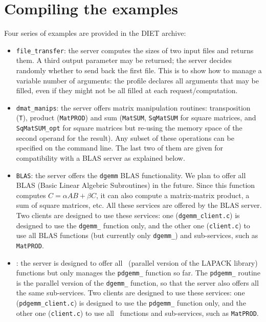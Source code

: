 \section{Compiling the examples}

Four series of examples are provided in the DIET archive:
\begin{itemize}
\item{\texttt{file\_transfer}}: the server computes the sizes of two
  input files and returns them. A third output parameter may be
  returned; the server decides randomly whether to send back the
  first file. This is to show how to manage a variable number of
  arguments: the profile declares all arguments that may be filled,
  even if they might not be all filled at each request/computation.

\item{\texttt{dmat\_manips}}: the server offers matrix manipulation
  routines: transposition (\texttt{T}), product (\texttt{MatPROD}) and
  sum (\texttt{MatSUM}, \texttt{SqMatSUM} for square matrices, and
  \texttt{SqMatSUM\_opt} for square matrices but re-using the memory
  space of the second operand for the result). Any subset of these
  operations can be specified on the command line. The last two of
  them are given for compatibility with a BLAS server as explained below.
  
\item{\texttt{BLAS}}: the server offers the \texttt{dgemm} BLAS
  functionality.  We plan to offer all BLAS (Basic Linear Algebric
  Subroutines) in the future. Since this function computes
  $C = \alpha AB + \beta C$, it can also compute a matrix-matrix
  product, a sum of square matrices, etc. All these services are
  offered by the BLAS server. Two clients are designed to use these
  services: one (\texttt{dgemm\_client.c}) is designed to use the
  \texttt{dgemm\_} function only, and the other one
  (\texttt{client.c}) to use all BLAS functions (but currently only
  \texttt{dgemm\_}) and sub-services, such as \texttt{MatPROD}.
  
\item{\texttt{\scalapack}}: the server is designed to offer all
  \scalapack\  (parallel version of the LAPACK library) functions but
  only manages the \texttt{pdgemm\_} function so far. The
  \texttt{pdgemm\_} routine is the parallel version of the
  \texttt{dgemm\_} function, so that the server also offers all the
  same sub-services. Two clients are designed to use these services:
  one (\texttt{pdgemm\_client.c}) is designed to use the
  \texttt{pdgemm\_} function only, and the other one
  (\texttt{client.c}) to use all \scalapack\ functions and
  sub-services, such as \texttt{MatPROD}.
\end{itemize}


